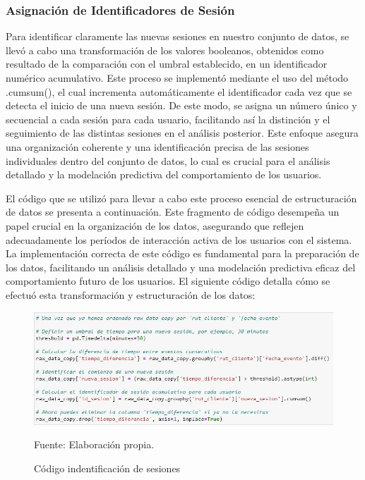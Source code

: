 \subsubsection{Asignación de Identificadores de Sesión} 
Para identificar claramente las nuevas sesiones en nuestro conjunto de datos, se llevó a cabo una transformación de los valores booleanos, obtenidos como resultado de la comparación con el umbral establecido, en un identificador numérico acumulativo. Este proceso se implementó mediante el uso del método .cumsum(), el cual incrementa automáticamente el identificador cada vez que se detecta el inicio de una nueva sesión. De este modo, se asigna un número único y secuencial a cada sesión para cada usuario, facilitando así la distinción y el seguimiento de las distintas sesiones en el análisis posterior. Este enfoque asegura una organización coherente y una identificación precisa de las sesiones individuales dentro del conjunto de datos, lo cual es crucial para el análisis detallado y la modelación predictiva del comportamiento de los usuarios.

El código que se utilizó para llevar a cabo este proceso esencial de estructuración de datos se presenta a continuación. Este fragmento de código desempeña un papel crucial en la organización de los datos, asegurando que reflejen adecuadamente los períodos de interacción activa de los usuarios con el sistema. La implementación correcta de este código es fundamental para la preparación de los datos, facilitando un análisis detallado y una modelación predictiva eficaz del comportamiento futuro de los usuarios. El siguiente código detalla cómo se efectuó esta transformación y estructuración de los datos:

\begin{figure}[H]
    \begin{minipage}[t]{0.9\textwidth}
        \caption{Código indentificación de sesiones}
        \label{identificación_sesiones}        
    \end{minipage}

    \vspace{10pt}

    \begin{minipage}[b]{1\textwidth}
        \centering
        \includegraphics[width=\textwidth]{img/Código identificación sesiones.jpg}        
    \end{minipage}

    \begin{minipage}[t]{0.9\textwidth}
        Fuente: Elaboración propia.
    \end{minipage}
\end{figure}

